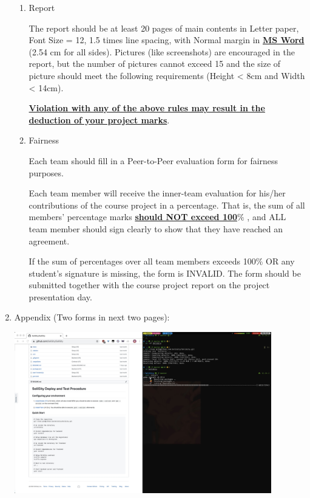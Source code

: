 \documentclass[12pt]{article}
\renewcommand{\_}{\kern-1.5pt\textunderscore\kern-1.5pt}
\begin{document}
\begin{enumerate}
\begin{enumerate}
	\item Report\par

The report should be at least 20 pages of main contents in Letter paper, Font Size = 12, 1.5 times line spacing, with Normal margin in \textbf{\uline{MS Word}} (2.54 cm for all sides). Pictures (like screenshots) are encouraged in the report, but the number of pictures cannot exceed 15 and the size of picture should meet the following requirements (Height < 8cm and Width < 14cm).\par

\textbf{\uline{Violation with any of the above rules may result in the deduction of your project marks}}.\par

	\item Fairness\par

Each team should fill in a Peer-to-Peer evaluation form for fairness purposes.\par

Each team member will receive the inner-team evaluation for his/her contributions of the course project in a percentage. That is, the sum of all members’ percentage marks \textbf{\uline{should NOT exceed 100}}$\%$ , and ALL team member should sign clearly to show that they have reached an agreement.\par

If the sum of percentages over all team members exceeds 100$\%$  OR any student’s signature is missing, the form is INVALID. The form should be submitted together with the course project report on the project presentation day.\par


\vspace{\baselineskip}

\end{enumerate}
	\item Appendix (Two forms in next two pages): 


\includegraphics[height=7cm]{graphs/01. git_clone}


\end{enumerate}
\end{document}
